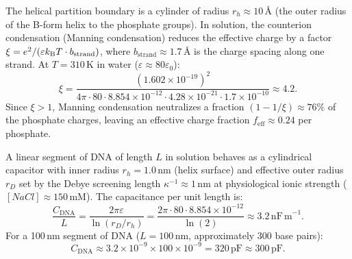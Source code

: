 The helical partition boundary is a cylinder of radius $r_h \approx 10\,\text{\AA}$
(the outer radius of the B-form helix to the phosphate groups). In solution,
the counterion condensation (Manning condensation) reduces the effective charge
by a factor $\xi = e^2 / (\varepsilon k_{\mathrm{B}} T \cdot b_{\mathrm{strand}})$, where
$b_{\mathrm{strand}} \approx 1.7\,\text{\AA}$ is the charge spacing along one
strand. At $T = 310\,\mathrm{K}$ in water ($\varepsilon \approx 80 \varepsilon_0$):
\begin{equation}
  \xi = \frac{(1.602\times10^{-19})^2}{4\pi \cdot 80 \cdot 8.854\times10^{-12} \cdot 4.28\times10^{-21} \cdot 1.7\times10^{-10}} \approx 4.2.
\end{equation}
Since $\xi > 1$, Manning condensation neutralizes a fraction
$(1 - 1/\xi) \approx 76\%$ of the phosphate charges, leaving an effective
charge fraction $f_{\mathrm{eff}} \approx 0.24$ per phosphate.

\begin{proposition}
\label{prop:dna_capacitance}
A linear segment of DNA of length $L$ in solution behaves as a cylindrical
capacitor with inner radius $r_h = 1.0\,\mathrm{nm}$ (helix surface) and
effective outer radius $r_D$ set by the Debye screening length
$\kappa^{-1} \approx 1\,\mathrm{nm}$ at physiological ionic strength
($[NaCl] \approx 150\,\mathrm{mM}$). The capacitance per unit length is:
\begin{equation}
  \frac{C_{\mathrm{DNA}}}{L} = \frac{2\pi \varepsilon}{\ln(r_D / r_h)}
    = \frac{2\pi \cdot 80 \cdot 8.854 \times 10^{-12}}{\ln(2)}
    \approx 3.2\,\mathrm{nF\,m}^{-1}.
  \label{eq:dna_capacitance_per_length}
\end{equation}
For a 100\,nm segment of DNA ($L = 100\,\mathrm{nm}$, approximately 300 base pairs):
\begin{equation}
  C_{\mathrm{DNA}} \approx 3.2 \times 10^{-9} \times 100 \times 10^{-9} = 320\,\mathrm{pF} \approx 300\,\mathrm{pF}.
  \label{eq:dna_capacitance_total}
\end{equation}
\end{proposition}

